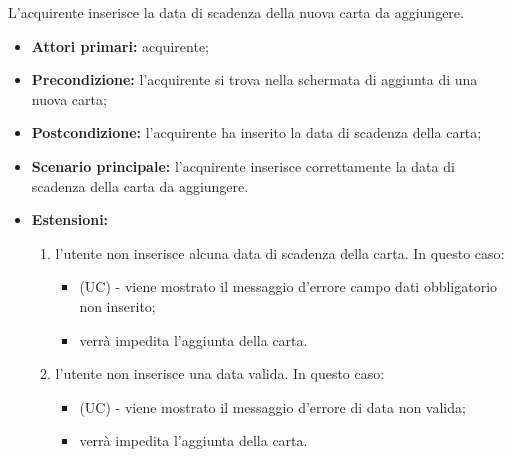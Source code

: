 L'acquirente inserisce la data di scadenza della nuova carta da aggiungere.
\begin{itemize}
    \item \textbf{Attori primari:} acquirente;
    \item \textbf{Precondizione:} l'acquirente si trova nella schermata di aggiunta di una nuova carta;
    \item \textbf{Postcondizione:} l'acquirente ha inserito la data di scadenza della carta;
    \item \textbf{Scenario principale:} l'acquirente inserisce correttamente la data di scadenza della carta da aggiungere.
    \item \textbf{Estensioni:}
    \begin{enumerate}[label=\lett]
        \item l'utente non inserisce alcuna data di scadenza della carta. In questo caso:
        \begin{itemize}
            \item (UC) - viene mostrato il messaggio d'errore campo dati obbligatorio non inserito;
            \item verrà impedita l'aggiunta della carta.
        \end{itemize}
        \item l'utente non inserisce una data valida. In questo caso:
        \begin{itemize}
            \item (UC) - viene mostrato il messaggio d'errore di data non valida;
            \item verrà impedita l'aggiunta della carta.
        \end{itemize}
    \end{enumerate}
\end{itemize}



